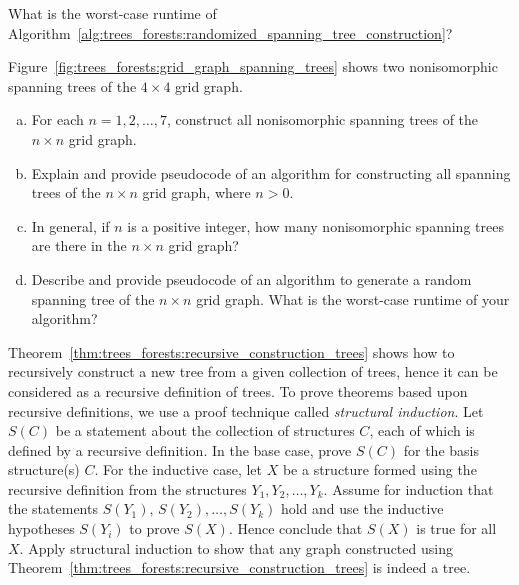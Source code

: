 \begin{problem}
\item What is the worst-case runtime of
  Algorithm~\ref{alg:trees_forests:randomized_spanning_tree_construction}?

\item Figure~\ref{fig:trees_forests:grid_graph_spanning_trees} shows
  two nonisomorphic spanning trees of the $4 \times 4$ grid graph.
  \begin{enumerate}[(a)]
  \item For each $n = 1, 2, \dots, 7$, construct all nonisomorphic
    spanning trees of the $n \times n$ grid graph.

  \item Explain and provide pseudocode of an algorithm for
    constructing all spanning trees of the
    $n \times n$ grid graph, where $n > 0$.

  \item In general, if $n$ is a positive integer, how many
    nonisomorphic spanning trees are there in the $n \times n$ grid
    graph?

  \item Describe and provide pseudocode of an algorithm to generate a
    random spanning tree
    of the $n \times n$ grid graph. What is the worst-case runtime of
    your algorithm?
  \end{enumerate}

\item Theorem~\ref{thm:trees_forests:recursive_construction_trees}
  shows how to recursively construct a new tree from
  a given collection of trees, hence it can be considered as a
  recursive definition of trees. To
  prove theorems based upon recursive definitions, we use a proof
  technique called
  \emph{structural induction}. Let $S(C)$
  be a statement about the collection of structures $C$, each of which
  is defined by a recursive definition. In the base case, prove $S(C)$
  for the basis structure(s) $C$. For the inductive
  case, let $X$ be a structure formed using the recursive definition
  from the structures $Y_1, Y_2, \dots, Y_k$. Assume for induction
  that the statements $S(Y_1),\, S(Y_2), \dots, S(Y_k)$ hold and use
  the inductive hypotheses $S(Y_i)$ to prove $S(X)$. Hence conclude
  that $S(X)$ is true for all $X$. Apply structural induction to show
  that any graph constructed using
  Theorem~\ref{thm:trees_forests:recursive_construction_trees} is
  indeed a tree.


\end{problem}

